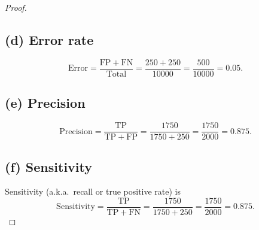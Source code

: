 \documentclass[en,hazy,blue,12pt,normal]{elegantnote}
\begin{document}
\begin{proof}
\subsection*{(d) Error rate}
\[
\mathrm{Error} = \frac{\mathrm{FP}+\mathrm{FN}}{\text{Total}}
= \frac{250+250}{10000}
= \frac{500}{10000}
= 0.05.
\]

\subsection*{(e) Precision}
\[
\mathrm{Precision} = \frac{\mathrm{TP}}{\mathrm{TP}+\mathrm{FP}}
= \frac{1750}{1750+250}
= \frac{1750}{2000}
= 0.875.
\]

\subsection*{(f) Sensitivity}
Sensitivity (a.k.a.\ recall or true positive rate) is
\[
\mathrm{Sensitivity} = \frac{\mathrm{TP}}{\mathrm{TP}+\mathrm{FN}}
= \frac{1750}{1750+250}
= \frac{1750}{2000}
= 0.875.
\]
\end{proof}
\end{document}
